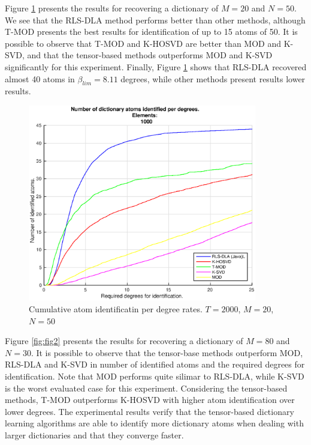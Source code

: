 Figure \ref{fig:fig1} presents the results for recovering a dictionary of $M=20$ and $N=50$. We see that the RLS-DLA method performs better than other methods, although T-MOD presents the best results for identification of up to 15 atoms of 50. It is possible to observe that T-MOD and K-HOSVD are better than MOD and K-SVD, and that the tensor-based methods outperforms MOD and K-SVD significantly for this experiment. Finally, Figure \ref{fig:fig1} shows that RLS-DLA recovered almost 40 atoms in $\beta_{lim} = 8.11$ degrees, while other methods present results lower results.

\begin{figure}[!htb]
	\centering 
	\includegraphics[width=10cm]{figures/5_20_2000_1000_100.eps}
	\caption{Cumulative atom identificatin per degree rates. $T=2000$, $M=20$, $N=50$}
	\label{fig:fig1}
\end{figure}

Figure \ref{fig:fig2} presents the results for recovering a dictionary of $M=80$ and $N=30$. It is possible to observe that the tensor-base methods outperform MOD, RLS-DLA and K-SVD in number of identified atoms and the required degrees for identification. Note that MOD performs quite silimar to RLS-DLA, while K-SVD is the worst evaluated case for this experiment. Considering the tensor-based methods, T-MOD outperforms K-HOSVD with higher atom identification over lower degrees. The experimental results verify that the tensor-based dictionary learning algorithms are able to identify more dictionary atoms when dealing with larger dictionaries and that they converge faster.

